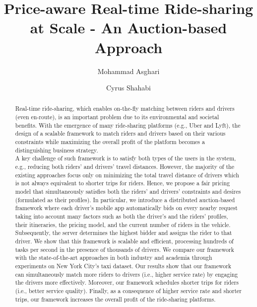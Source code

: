 \documentclass[large]{acmart}
\begin{document}
\title{Price-aware Real-time Ride-sharing at Scale - An Auction-based Approach} 
\author{Mohammad Asghari}
\author{Cyrus Shahabi}


\begin{abstract}
Real-time ride-sharing, which enables on-the-fly matching between riders and drivers (even en-route), is an important problem due to its environmental and societal benefits. With the emergence of many ride-sharing platforms (e.g., Uber and Lyft), the design of a scalable framework to match riders and drivers based on their various constraints while maximizing the overall profit of the platform becomes a distinguishing business strategy.\\
A key challenge of such framework is to satisfy both types of the users in the system, e.g., reducing both riders' and drivers' travel distances. However, the majority of the existing approaches focus only on minimizing the total travel distance of drivers which is not always equivalent to shorter trips for riders. Hence, we propose a fair pricing model that simultaneously satisfies both the riders' and drivers' constraints and desires (formulated as their profiles). In particular, we introduce a distributed auction-based framework where each driver's mobile app automatically bids on every nearby request taking into account many factors such as both the driver's and the riders' profiles, their itineraries, the pricing model, and the current number of riders in the vehicle.  Subsequently, the server determines the highest bidder and assigns the rider to that driver. We show that this framework is scalable and efficient, processing hundreds of tasks per second in the presence of thousands of drivers. We compare our framework with the state-of-the-art approaches in both industry and academia through experiments on New York City's taxi dataset.  Our results show that our framework can simultaneously match more riders to drivers (i.e., higher service rate) by engaging the drivers more effectively. Moreover, our framework schedules shorter trips for riders (i.e., better service quality). Finally, as a consequence of higher service rate and shorter trips, our framework increases the overall profit of the ride-sharing platforms.
\end{abstract}
\end{document}
